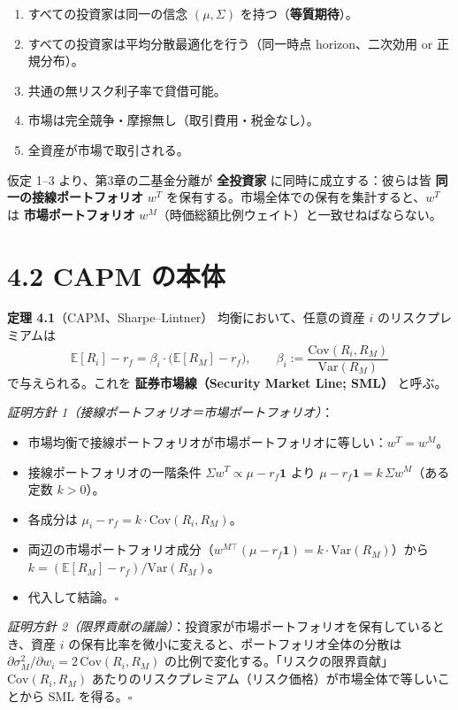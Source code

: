 \documentclass[11pt,a4paper]{report}
\begin{document}
\begin{enumerate}
\item すべての投資家は同一の信念 $(\mu, \Sigma)$ を持つ（\textbf{等質期待}）。
\item すべての投資家は平均分散最適化を行う（同一時点 horizon、二次効用 or 正規分布）。
\item 共通の無リスク利子率で貸借可能。
\item 市場は完全競争・摩擦無し（取引費用・税金なし）。
\item 全資産が市場で取引される。
\end{enumerate}

仮定 1–3 より、第3章の二基金分離が \textbf{全投資家} に同時に成立する：彼らは皆 \textbf{同一の接線ポートフォリオ} $w^T$ を保有する。市場全体での保有を集計すると、$w^T$ は \textbf{市場ポートフォリオ} $w^M$（時価総額比例ウェイト）と一致せねばならない。

\section{4.2 CAPM の本体}

\textbf{定理 4.1}（CAPM、Sharpe–Lintner） 均衡において、任意の資産 $i$ のリスクプレミアムは \[ \boxed{\; \mathbb{E}[R_i] - r_f = \beta_i \cdot \big(\mathbb{E}[R_M] - r_f\big),\qquad \beta_i := \frac{\mathrm{Cov}(R_i, R_M)}{\mathrm{Var}(R_M)} \;} \] で与えられる。これを \textbf{証券市場線（Security Market Line; SML）} と呼ぶ。

\emph{証明方針 1（接線ポートフォリオ＝市場ポートフォリオ）}：
\begin{itemize}
\item 市場均衡で接線ポートフォリオが市場ポートフォリオに等しい：$w^T = w^M$。
\item 接線ポートフォリオの一階条件 $\Sigma w^T \propto \mu - r_f\mathbf{1}$ より $\mu - r_f \mathbf{1} = k\, \Sigma w^M$（ある定数 $k>0$）。
\item 各成分は $\mu_i - r_f = k \cdot \mathrm{Cov}(R_i, R_M)$。
\item 両辺の市場ポートフォリオ成分（$w^{M\top}(\mu - r_f\mathbf{1}) = k \cdot \mathrm{Var}(R_M)$）から $k = (\mathbb{E}[R_M] - r_f)/\mathrm{Var}(R_M)$。
\item 代入して結論。$\square$
\end{itemize}

\emph{証明方針 2（限界貢献の議論）}：投資家が市場ポートフォリオを保有しているとき、資産 $i$ の保有比率を微小に変えると、ポートフォリオ全体の分散は $\partial \sigma_M^2 / \partial w_i = 2\, \mathrm{Cov}(R_i, R_M)$ の比例で変化する。「リスクの限界貢献」 $\mathrm{Cov}(R_i, R_M)$ あたりのリスクプレミアム（リスク価格）が市場全体で等しいことから SML を得る。$\square$
\end{document}
